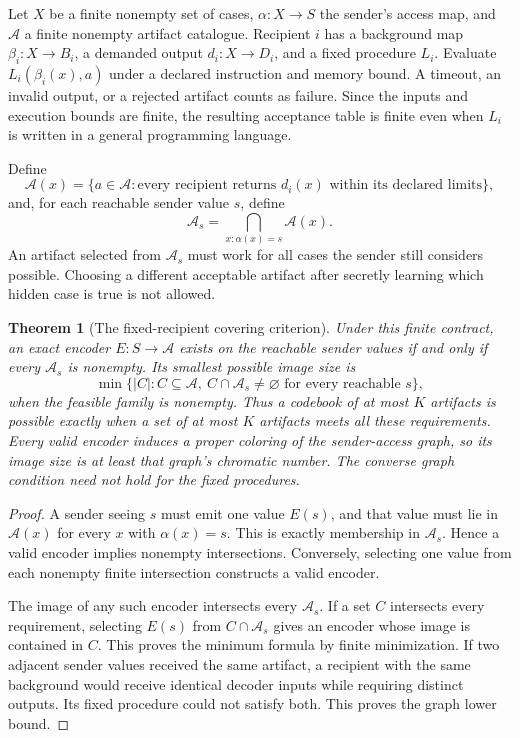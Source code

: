 \documentclass[11pt,letterpaper]{article}
\theoremstyle{plain}
\newtheorem{theorem}{Theorem}[section]
\theoremstyle{definition}
\begin{document}
Let $X$ be a finite nonempty set of cases, $\alpha:X\to S$ the sender's access map, and $\mathcal A$ a finite nonempty artifact catalogue. Recipient $i$ has a background map $\beta_i:X\to B_i$, a demanded output $d_i:X\to D_i$, and a fixed procedure $L_i$. Evaluate $L_i(\beta_i(x),a)$ under a declared instruction and memory bound. A timeout, an invalid output, or a rejected artifact counts as failure. Since the inputs and execution bounds are finite, the resulting acceptance table is finite even when $L_i$ is written in a general programming language.

Define
\[
\mathcal A(x)=\{a\in\mathcal A:\text{every recipient returns }d_i(x)
\text{ within its declared limits}\},
\]
and, for each reachable sender value $s$, define
\begin{equation}\label{eq:decoder-intersection}
\mathcal A_s=\bigcap_{x:\alpha(x)=s}\mathcal A(x).
\end{equation}
An artifact selected from $\mathcal A_s$ must work for all cases the sender still considers possible. Choosing a different acceptable artifact after secretly learning which hidden case is true is not allowed.

\begin{theorem}[The fixed-recipient covering criterion]\label{thm:fixed-decoder}
Under this finite contract, an exact encoder $E:S\to\mathcal A$ exists on the reachable sender values if and only if every $\mathcal A_s$ is nonempty. Its smallest possible image size is
\begin{equation}\label{eq:decoder-cover}
\min\{|C|:C\subseteq\mathcal A,\ C\cap\mathcal A_s\ne\varnothing
\text{ for every reachable }s\},
\end{equation}
when the feasible family is nonempty. Thus a codebook of at most $K$ artifacts is possible exactly when a set of at most $K$ artifacts meets all these requirements. Every valid encoder induces a proper coloring of the sender-access graph, so its image size is at least that graph's chromatic number. The converse graph condition need not hold for the fixed procedures.
\end{theorem}
\begin{proof}
A sender seeing $s$ must emit one value $E(s)$, and that value must lie in $\mathcal A(x)$ for every $x$ with $\alpha(x)=s$. This is exactly membership in $\mathcal A_s$. Hence a valid encoder implies nonempty intersections. Conversely, selecting one value from each nonempty finite intersection constructs a valid encoder.

The image of any such encoder intersects every $\mathcal A_s$. If a set $C$ intersects every requirement, selecting $E(s)$ from $C\cap\mathcal A_s$ gives an encoder whose image is contained in $C$. This proves the minimum formula by finite minimization. If two adjacent sender values received the same artifact, a recipient with the same background would receive identical decoder inputs while requiring distinct outputs. Its fixed procedure could not satisfy both. This proves the graph lower bound.
\end{proof}
\end{document}
